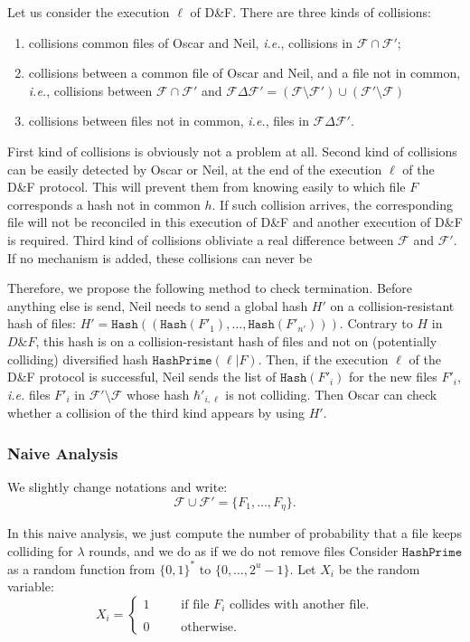 \documentclass[11pt]{llncs}
\newcommand{\Files}{\mathcal{F}}
\newcommand{\df}{D\&F\xspace}
\newcommand{\ie}{\textit{i.e.}\xspace}
\newcommand{\Hash}{\ensuremath{\mathtt{Hash}}}
\newcommand{\HashPrime}{\ensuremath{\mathtt{HashPrime}}}
\begin{document}
Let us consider the execution $\ell$ of \df.
There are three kinds of collisions:
\begin{enumerate}
\item collisions common files of Oscar and Neil, \ie, collisions in $\Files \cap \Files'$;
\item collisions between a common file of Oscar and Neil, and a file not in common, \ie, collisions between $\Files \cap \Files'$ and $\Files \Delta \Files' = (\Files \setminus \Files') \cup (\Files' \setminus \Files)$
\item collisions between files not in common, \ie, files in $\Files \Delta \Files'$.
\end{enumerate}
First kind of collisions is obviously not a problem at all.
Second kind of collisions can be easily detected by Oscar or Neil, at the end of the execution $\ell$ of the \df protocol. 
This will prevent them from knowing easily to which file $F$ corresponds a hash not in common $h$.
If such collision arrives, the corresponding file will not be reconciled in this execution of \df and another execution of \df is required.
Third kind of collisions obliviate a real difference between $\Files$ and $\Files'$. If no mechanism is added, these collisions can never be

Therefore, we propose the following method to check termination.
Before anything else is send, Neil needs to send a global hash $H'$ on a collision-resistant hash of files: $H' = \Hash((\Hash(F'_1),\dots,\Hash(F'_{n'})))$.
Contrary to $H$ in $\df$, this hash is on a collision-resistant hash of files and not on (potentially colliding) diversified hash $ \HashPrime(\ell|F)$.
Then, if the execution $\ell$ of the \df protocol is successful, Neil sends the list of $\Hash(F'_i)$ for the new files $F'_i$, \ie files $F'_i$ in $\Files' \setminus \Files$ whose hash $\hbar'_{i,\ell}$ is not colliding.
Then Oscar can check whether a collision of the third kind appears by using $H'$.


\subsubsection{Naive Analysis}

We slightly change notations and write:
\[ \Files \cup \Files' = \{ F_1, \dots, F_\eta \}. \]

In this naive analysis, we just compute the number of probability that a file keeps colliding for $\lambda$ rounds, and we do as if we do not remove files 
Consider $\HashPrime$ as a random function from $\{0,1\}^*$ to $\{0,\dots,2^u-1\}$. Let $X_i$ be the random variable:
\[
X_i =
\left\{
\begin{array}{lcl}
1 & ~~~~&  \mbox{if file $F_i$ collides with another file.}\\
\\
0 & ~~~~&  \mbox{otherwise.}
\end{array}
\right.
\]
\end{document}
